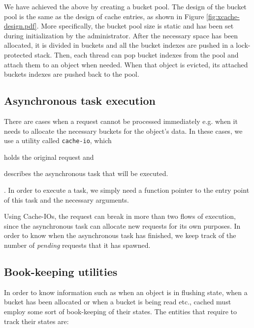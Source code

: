 We have achieved the above by creating a bucket pool. The design of the bucket 
pool is the same as the design of cache entries, as shown in Figure 
\ref{fig:xcache-design.pdf}. More specifically, the bucket pool size is static 
and has been set during initialization by the administrator. After the 
necessary space has been allocated, it is divided in buckets and all the bucket 
indexes are pushed in a lock-protected stack. Then, each thread can pop bucket 
indexes from the pool and attach them to an object when needed. When that 
object is evicted, its attached buckets indexes are pushed back to the pool.

\subsection{Asynchronous task execution}

There are cases when a request cannot be processed immediately e.g. when it 
needs to allocate the necessary buckets for the object's data. In these cases, 
we use a utility called \texttt{cache-io}, which
\begin{inparaenum}[i)]
\item holds the original request and
\item describes the asynchronous task that will be executed.
\end{inparaenum}. In order to execute a task, we simply need a function pointer 
to the entry point of this task and the necessary arguments.

Using Cache-IOs, the request can break in more than two flows of execution, 
since the asynchronous task can allocate new requests for its own purposes.  In 
order to know when the asynchronous task has finished, we keep track of the 
number of \emph{pending} requests that it has spawned.

\subsection{Book-keeping utilities}\label{sec:cached-states-design}

In order to know information such as when an object is in flushing state, when 
a bucket has been allocated or when a bucket is being read etc., cached must 
employ some sort of book-keeping of their states. The entities that require to 
track their states are:

